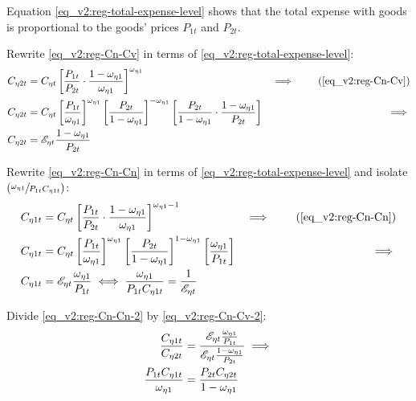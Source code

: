 \documentclass[../thesis.tex]{subfiles}
\begin{document}
Equation \ref{eq_v2:reg-total-expense-level} shows that the total expense with goods is proportional to the goods' prices $P_{1 t}$ and $P_{2 t}$.

Rewrite \ref{eq_v2:reg-Cn-Cv} in terms of \ref{eq_v2:reg-total-expense-level}:
\begin{alignat}{2}
	C_{\eta 2 t} &= C_{\eta t} \left[ \frac{P_{1 t}}{P_{2 t}} \cdot \frac{1 -\omega_{\eta 1}}{\omega_{\eta 1}} \right]^{\omega_{\eta 1}} &\implies \tag{\ref{eq_v2:reg-Cn-Cv}} \\
	C_{\eta 2 t} &= C_{\eta t} \left[ \frac{P_{1 t}}{\omega_{\eta 1}} \right]^{\omega_{\eta 1}} \left[ \frac{P_{2 t}}{1 -\omega_{\eta 1}} \right]^{-\omega_{\eta 1}} \left[ \frac{P_{2 t}}{1 -\omega_{\eta 1}} \cdot \frac{1 -\omega_{\eta 1}}{P_{2 t}} \right] &\implies \nonumber \\
	C_{\eta 2 t} &= \te \frac{1 -\omega_{\eta 1}}{P_{2 t}} \label{eq_v2:reg-Cn-Cv-2}
\end{alignat}

Rewrite \ref{eq_v2:reg-Cn-Cn} in terms of \ref{eq_v2:reg-total-expense-level} and isolate $(\sfrac{\omega_{\eta 1}}{P_{1 t} C_{\eta 1 t}})$:
	\begin{alignat}{2}
		C_{\eta 1 t} &= C_{\eta t} \left[ \frac{P_{1 t}}{P_{2 t}} \cdot \frac{1 -\omega_{\eta 1}}{\omega_{\eta 1}} \right]^{\omega_{\eta 1} -1} &\implies \tag{\ref{eq_v2:reg-Cn-Cn}} \\
		C_{\eta 1 t} &= C_{\eta t} \left[ \frac{ P_{1 t}}{ \omega_{\eta 1}}\right]^{ \omega_{\eta 1}} \left[ \frac{P_{2 t}}{1-\omega_{\eta 1}} \right]^{1 -\omega_{\eta 1}} \left[ \frac{\omega_{\eta 1}}{P_{1 t}} \right] &\implies \nonumber \\
		C_{\eta 1 t} &= \te \frac{\omega_{\eta 1}}{P_{1 t}} \iff
		\frac{\omega_{\eta 1}}{P_{1 t} C_{\eta 1 t}} = \frac{1}{\te} \label{eq_v2:reg-Cn-Cn-2}
	\end{alignat}

\begin{tcolorbox}[colback=red!5!white,colframe=red!75!black]

Divide \ref{eq_v2:reg-Cn-Cn-2} by \ref{eq_v2:reg-Cn-Cv-2}:
\begin{align}
	\frac{C_{\eta 1 t}}{C_{\eta 2 t}} &= \frac{{\mathscr{E}_{\eta t}} \frac{\omega_{\eta 1}}{P_{1 t}}}{{\mathscr{E}_{\eta t}} \frac{1 -\omega_{\eta 1}}{P_{2 t}}} \implies \nonumber \\
	\frac{P_{1 t} C_{\eta 1 t}}{\omega_{\eta 1}} &= \frac{P_{2 t} C_{\eta 2 t}}{1 -\omega_{\eta 1}} \label{eq_v2:reg-Cn1-Cn2}
\end{align}

\end{tcolorbox}
\end{document}
